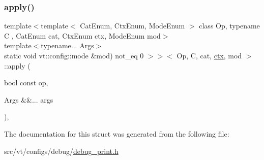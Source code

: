 \subsubsection{\texorpdfstring{apply()}{apply()}}
{\footnotesize\ttfamily template$<$template$<$ Cat\+Enum, Ctx\+Enum, Mode\+Enum $>$ class Op, typename C , Cat\+Enum cat, Ctx\+Enum ctx, Mode\+Enum mod$>$ \\
template$<$typename... Args$>$ \\
static void vt\+::config\+::mode \&mod) not\+\_\+eq 0 $>$$>$$<$ Op, C, cat, \hyperlink{namespacevt_1_1config_a0551245b6b893932b95aaf8eac94eed1}{ctx}, mod $>$\+::apply (\begin{DoxyParamCaption}\item[{bool const}]{op,  }\item[{Args \&\&...}]{args }\end{DoxyParamCaption})\hspace{0.3cm}{\ttfamily [inline]}, {\ttfamily [static]}}



The documentation for this struct was generated from the following file\+:\begin{DoxyCompactItemize}
\item 
src/vt/configs/debug/\hyperlink{debug__print_8h}{debug\+\_\+print.\+h}\end{DoxyCompactItemize}
